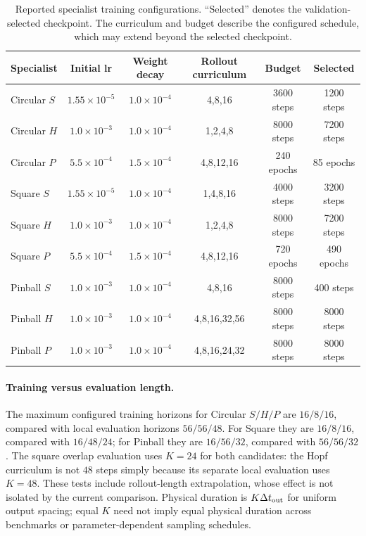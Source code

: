 \documentclass{article}
\providecommand{\DIFaddtex}[1]{{\protect\color{blue} \sf #1}} %
\providecommand{\DIFaddbegin}{} %
\providecommand{\DIFadd}[1]{\texorpdfstring{\DIFaddtex{#1}}{#1}} %
\providecommand{\DIFaddincludegraphics}[2][]{{\color{blue}\fbox{\DIFOincludegraphics[#1]{#2}}}} %
\DeclareRobustCommand{\DIFaddbegin}{\DIFOaddbegin \let\includegraphics\DIFaddincludegraphics} %
\begin{document}
\par
\begin{table}[H]
\centering
\caption{
Reported specialist training configurations. ``Selected'' denotes the validation-selected checkpoint. The curriculum and budget describe the configured schedule, which may extend beyond the selected checkpoint.
}
\label{tab:specialist_training}
\small
\setlength{\tabcolsep}{3.5pt}
\begin{tabular}{@{}lccccc@{}}
\toprule
Specialist & Initial lr & Weight decay & Rollout curriculum & Budget & Selected \\
\midrule
Circular $S$
& $1.55{\times}10^{-5}$ & $1.0{\times}10^{-4}$
& 4,8,16 & 3600 steps & 1200 steps \\
Circular $H$
& $1.0{\times}10^{-3}$ & $1.0{\times}10^{-4}$
& 1,2,4,8 & 8000 steps & 7200 steps \\
Circular $P$
& $5.5{\times}10^{-4}$ & $1.5{\times}10^{-4}$
& 4,8,12,16 & 240 epochs & 85 epochs \\
\addlinespace
Square $S$
& $1.55{\times}10^{-5}$ & $1.0{\times}10^{-4}$
& 1,4,8,16 & 4000 steps & 3200 steps \\
Square $H$
& $1.0{\times}10^{-3}$ & $1.0{\times}10^{-4}$
& 1,2,4,8 & 8000 steps & 7200 steps \\
Square $P$
& $5.5{\times}10^{-4}$ & $1.5{\times}10^{-4}$
& 4,8,12,16 & 720 epochs & 490 epochs \\
\addlinespace
Pinball $S$
& $1.0{\times}10^{-3}$ & $1.0{\times}10^{-4}$
& 4,8,16 & 8000 steps & 400 steps \\
Pinball $H$
& $1.0{\times}10^{-3}$ & $1.0{\times}10^{-4}$
& 4,8,16,32,56 & 8000 steps & 8000 steps \\
Pinball $P$
& $1.0{\times}10^{-3}$ & $1.0{\times}10^{-4}$
& 4,8,16,24,32 & 8000 steps & 8000 steps \\
\bottomrule
\end{tabular}
\end{table}
\par

\DIFaddbegin \paragraph{\DIFadd{Training versus evaluation length.}}
\DIFadd{The maximum configured training horizons for Circular $S/H/P$ are $16/8/16$, compared with local evaluation horizons $56/56/48$. For Square they are $16/8/16$, compared with $16/48/24$; for Pinball they are $16/56/32$, compared with $56/56/32$. The square overlap evaluation uses $K=24$ for both candidates: the Hopf curriculum is not $48$ steps simply because its separate local evaluation uses $K=48$. These tests include rollout-length extrapolation, whose effect is not isolated by the current comparison. Physical duration is $K\Delta t_{\rm out}$ for uniform output spacing; equal $K$ need not imply equal physical duration across benchmarks or parameter-dependent sampling schedules.
}
\end{document}
